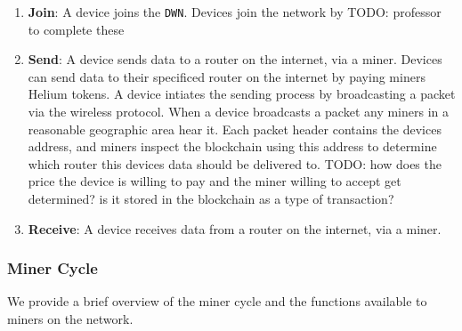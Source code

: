 \documentclass[letterpaper,11pt]{article}
\newcommand{\todo}[1]{}
\renewcommand{\todo}[1]{{\color{red} TODO: {#1}}}
\begin{document}
\begin{enumerate}
  \item \textbf{Join}: A device joins the \verb|DWN|.\newline
  Devices join the network by \todo{professor to complete these}\newline

  \item \textbf{Send}: A device sends data to a router on the internet, via a miner.\newline
  Devices can send data to their specificed router on the internet by paying miners Helium tokens.\newline\newline
  A device intiates the sending process by broadcasting a packet via the wireless protocol. When a device broadcasts a packet any miners in a reasonable geographic area hear it. Each packet header contains the devices address, and miners inspect the blockchain using this address to determine which router this devices data should be delivered to. \todo{how does the price the device is willing to pay and the miner willing to accept get determined? is it stored in the blockchain as a type of transaction?}\newline

  \item \textbf{Receive}: A device receives data from a router on the internet, via a miner.\newline


\end{enumerate}

\subsubsection{Miner Cycle} \label{mining}

We provide a brief overview of the miner cycle and the functions available to miners on the network.
\end{document}
